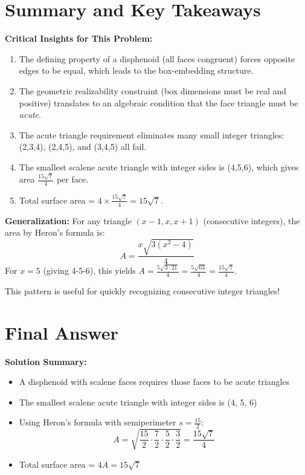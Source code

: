 \documentclass[12pt]{article}
\begin{document}
\section{Summary and Key Takeaways}

\begin{keyinsight}
\textbf{Critical Insights for This Problem:}

\begin{enumerate}
    \item The defining property of a disphenoid (all faces congruent) forces opposite edges to be equal, which leads to the box-embedding structure.
    
    \item The geometric realizability constraint (box dimensions must be real and positive) translates to an algebraic condition that the face triangle must be \textit{acute}.
    
    \item The acute triangle requirement eliminates many small integer triangles: (2,3,4), (2,4,5), and (3,4,5) all fail.
    
    \item The smallest scalene acute triangle with integer sides is (4,5,6), which gives area $\frac{15\sqrt{7}}{4}$ per face.
    
    \item Total surface area = $4 \times \frac{15\sqrt{7}}{4} = 15\sqrt{7}$.
\end{enumerate}
\end{keyinsight}

\begin{protip}
\textbf{Generalization:} For any triangle $(x-1, x, x+1)$ (consecutive integers), the area by Heron's formula is:
\[A = \frac{x\sqrt{3(x^2-4)}}{4}\]
For $x=5$ (giving 4-5-6), this yields $A = \frac{5\sqrt{3 \cdot 21}}{4} = \frac{5\sqrt{63}}{4} = \frac{15\sqrt{7}}{4}$.

This pattern is useful for quickly recognizing consecutive integer triangles!
\end{protip}

\section{Final Answer}

\begin{center}
\Large
{}
\end{center}

\textbf{Solution Summary:}
\begin{itemize}
    \item A disphenoid with scalene faces requires those faces to be acute triangles
    \item The smallest scalene acute triangle with integer sides is (4, 5, 6)
    \item Using Heron's formula with semiperimeter $s = \frac{15}{2}$:
    \[A = \sqrt{\frac{15}{2} \cdot \frac{7}{2} \cdot \frac{5}{2} \cdot \frac{3}{2}} = \frac{15\sqrt{7}}{4}\]
    \item Total surface area = $4A = 15\sqrt{7}$
\end{itemize}
\end{document}
